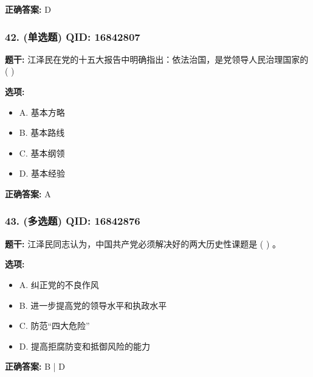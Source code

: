 \documentclass[12pt,UTF8]{ctexart}
\begin{document}
\textbf{正确答案:}
D

\vspace{0.3em}\hrulefill\vspace{0.7em}

\subsubsection*{42. (单选题) \small QID: 16842807}

\textbf{题干:}
江泽民在党的十五大报告中明确指出：依法治国，是党领导人民治理国家的 ( )

\textbf{选项:}
\begin{itemize}[leftmargin=*]

  \item A. 基本方略

  \item B. 基本路线

  \item C. 基本纲领

  \item D. 基本经验

\end{itemize}

\textbf{正确答案:}
A

\vspace{0.3em}\hrulefill\vspace{0.7em}

\subsubsection*{43. (多选题) \small QID: 16842876}

\textbf{题干:}
江泽民同志认为，中国共产党必须解决好的两大历史性课题是 ( ) 。

\textbf{选项:}
\begin{itemize}[leftmargin=*]

  \item A. 纠正党的不良作风

  \item B. 进一步提高党的领导水平和执政水平

  \item C. 防范“四大危险”

  \item D. 提高拒腐防变和抵御风险的能力

\end{itemize}

\textbf{正确答案:}
B | D

\vspace{0.3em}\hrulefill\vspace{0.7em}
\end{document}
